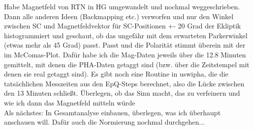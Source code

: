 \documentclass{tufte-book}
\newcommand{\newdaytt}[2]{\vspace{2cm}\marginnote{{\Large \textbf{\shortdayofweekname{#1}{#2}{2022}, ~\formatdate{#1}{#2}{2022}}}}}
\begin{document}
\newdaytt{28}{02}
Habe Magnetfeld von RTN in HG umgewandelt und nochmal weggeschrieben. Dann alle anderen Ideen (Backmapping etc.) verworfen und nur den Winkel zwischen SC und Magnetfeldvektor für SC-Positionen +- 20 Grad der Ekliptik histogrammiert und geschaut, ob das ungefähr mit dem erwarteten Parkerwinkel (etwas mehr als 45 Grad) passt. Passt und die Polarität stimmt überein mit der im McComas-Plot. Dafür habe ich die Mag-Daten jeweils über die 12.8 Minuten gemittelt, mit denen die PHA-Daten getaggt sind (bzw. über die Zeitstempel mit denen sie real getaggt sind). Es gibt noch eine Routine in uswipha, die die tatsächlichen Messzeiten aus den EpQ-Steps berechnet, also die Lücke zwischen den 13 Minuten schließt. Überlegen, ob das Sinn macht, das zu verfeinern und wie ich dann das Magnetfeld mitteln würde  \\
Als nächstes: In Gesamtanalyse einbauen, überlegen, was ich überhaupt anschauen will. Dafür auch die Normierung nochmal durchgehen...
%
%
%
\end{document}
